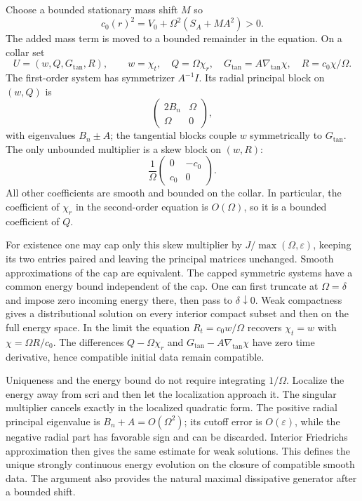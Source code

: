 \documentclass[11pt]{article}
\begin{document}
Choose a bounded stationary mass shift $M$ so
\[
 c_0(r)^2=V_0+\Omega^2(S_A+MA^2)>0.
\]
The added mass term is moved to a bounded remainder in the equation. On a collar set
\[
 U=(w,Q,G_{\tan},R),\qquad
 w=\chi_t,\quad Q=\Omega\chi_r,\quad
 G_{\tan}=A\nabla_{\tan}\chi,\quad R=c_0\chi/\Omega.
\]
The first-order system has symmetrizer $A^{-1}I$. Its radial principal block on $(w,Q)$ is
\[
 \begin{pmatrix}2B_n&\Omega\\\Omega&0\end{pmatrix},
\]
with eigenvalues $B_n\pm A$; the tangential blocks couple $w$ symmetrically to $G_{\tan}$. The only unbounded multiplier is a skew block on $(w,R)$:
\[
 \frac1\Omega\begin{pmatrix}0&-c_0\\c_0&0\end{pmatrix}.
\]
All other coefficients are smooth and bounded on the collar. In particular, the coefficient of $\chi_r$ in the second-order equation is $O(\Omega)$, so it is a bounded coefficient of $Q$.

For existence one may cap only this skew multiplier by $J/\max(\Omega,\varepsilon)$, keeping its two entries paired and leaving the principal matrices unchanged. Smooth approximations of the cap are equivalent. The capped symmetric systems have a common energy bound independent of the cap. One can first truncate at $\Omega=\delta$ and impose zero incoming energy there, then pass to $\delta\downarrow0$. Weak compactness gives a distributional solution on every interior compact subset and then on the full energy space. In the limit the equation $R_t=c_0w/\Omega$ recovers $\chi_t=w$ with $\chi=\Omega R/c_0$. The differences $Q-\Omega\chi_r$ and $G_{\tan}-A\nabla_{\tan}\chi$ have zero time derivative, hence compatible initial data remain compatible.

Uniqueness and the energy bound do not require integrating $1/\Omega$. Localize the energy away from scri and then let the localization approach it. The singular multiplier cancels exactly in the localized quadratic form. The positive radial principal eigenvalue is $B_n+A=O(\Omega^2)$; its cutoff error is $O(\varepsilon)$, while the negative radial part has favorable sign and can be discarded. Interior Friedrichs approximation then gives the same estimate for weak solutions. This defines the unique strongly continuous energy evolution on the closure of compatible smooth data. The argument also provides the natural maximal dissipative generator after a bounded shift.
\end{document}
